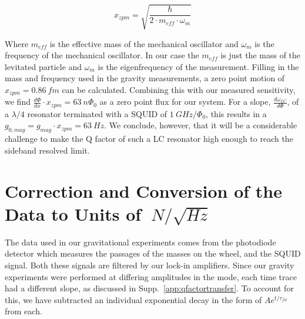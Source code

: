 \begin{appendices}
\begin{equation}
    x_{zpm} = \sqrt{\frac{\hbar}{2 \cdot m_{eff} \cdot \omega_m}}
\end{equation}

Where $m_{eff}$ is the effective mass of the mechanical oscillator and $\omega_m$ is the frequency of the mechanical oscillator. In our case the $m_{eff}$ is just the mass of the levitated particle and $\omega_m$ is the eigenfrequency of the measurement. Filling in the mass and frequency used in the gravity measurements, a zero point motion of $x_{zpm} = \SI{0.86}{fm}$ can be calculated. Combining this with our measured sensitivity, we find $\frac{d\Phi}{dx} \cdot x_{zpm}= \SI{63}{n\Phi_0}$ as a zero point flux for our system. For a slope, $\frac{d\omega_{LC}}{d\Phi}$,  of a $\lambda/4$ resonator terminated with a SQUID of $\SI{1}{GHz/\Phi_0}$, this results in a $g_{0,mag} = g_{mag} \cdot x_{zpm} = \SI{63}{Hz}$. 
We conclude, however, that it will be a considerable challenge to make the Q factor of such a LC resonator high enough to reach the sideband resolved limit.







\newpage

\section{Correction and Conversion of the Data to Units of \texorpdfstring{$\SI{}{N/\sqrt{Hz}}$}{N/rtHz}}
\label{app:correction_and_conversion}
The data used in our gravitational experiments comes from the photodiode detector which measures the passages of the masses on the wheel, and the SQUID signal. Both these signals are filtered by our lock-in amplifiers. Since our gravity experiments were performed at differing amplitudes in the mode, each time trace had a different slope, as discussed in Supp.~\ref{app:qfactortransfer}. To account for this, we have subtracted an individual exponential decay in the form of $Ae^{t/\tau_{fit}}$ from each.


\end{appendices}
